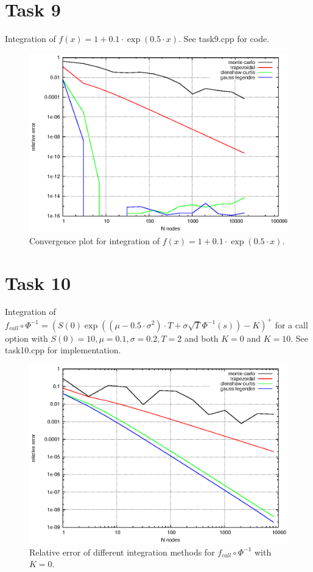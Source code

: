 \documentclass[]{article}
\begin{document}
\section*{Task 9}
Integration of $f(x)=1+0.1\cdot\exp(0.5\cdot x)$. See task9.cpp for code.
\begin{figure}[!ht]
\centering
\includegraphics{task9Plot}
\caption{Convergence plot for integration of $f(x)=1+0.1\cdot\exp(0.5\cdot x)$.}
\label{fig:Task9}
\end{figure}
\clearpage

\section*{Task 10}
Integration of $f_{call}\circ \Phi^{-1}=(S(0)\exp((\mu-0.5\cdot\sigma^2)\cdot T+\sigma\sqrt{T}\Phi^{-1}(s))-K)^+$ for a call option with $S(0)=10,\mu=0.1,\sigma=0.2,T=2$ and both $K=0$ and $K=10$. See task10.cpp for implementation.

\begin{figure}[!ht]
\centering
\includegraphics{task10Plot_0}
\caption{Relative error of different integration methods for
$f_{call}\circ \Phi^{-1}$ with $K = 0$.}
\label{fig:Task10_0}
\end{figure}
\end{document}
